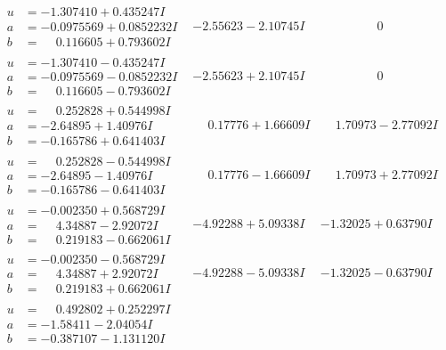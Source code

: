 \documentclass[1p]{elsarticle_modified}
\theoremstyle{definition}
\begin{document}
$$\begin{array}{c|c|c}
\begin{aligned}
u &= -1.307410 + 0.435247 I \\
a &= -0.0975569 + 0.0852232 I \\
b &= \phantom{-}0.116605 + 0.793602 I\end{aligned}
 & -2.55623 - 2.10745 I & \phantom{-0.000000 } 0 \\ \hline\begin{aligned}
u &= -1.307410 - 0.435247 I \\
a &= -0.0975569 - 0.0852232 I \\
b &= \phantom{-}0.116605 - 0.793602 I\end{aligned}
 & -2.55623 + 2.10745 I & \phantom{-0.000000 } 0 \\ \hline\begin{aligned}
u &= \phantom{-}0.252828 + 0.544998 I \\
a &= -2.64895 + 1.40976 I \\
b &= -0.165786 + 0.641403 I\end{aligned}
 & \phantom{-}0.17776 + 1.66609 I & \phantom{-}1.70973 - 2.77092 I \\ \hline\begin{aligned}
u &= \phantom{-}0.252828 - 0.544998 I \\
a &= -2.64895 - 1.40976 I \\
b &= -0.165786 - 0.641403 I\end{aligned}
 & \phantom{-}0.17776 - 1.66609 I & \phantom{-}1.70973 + 2.77092 I \\ \hline\begin{aligned}
u &= -0.002350 + 0.568729 I \\
a &= \phantom{-}4.34887 - 2.92072 I \\
b &= \phantom{-}0.219183 - 0.662061 I\end{aligned}
 & -4.92288 + 5.09338 I & -1.32025 + 0.63790 I \\ \hline\begin{aligned}
u &= -0.002350 - 0.568729 I \\
a &= \phantom{-}4.34887 + 2.92072 I \\
b &= \phantom{-}0.219183 + 0.662061 I\end{aligned}
 & -4.92288 - 5.09338 I & -1.32025 - 0.63790 I \\ \hline\begin{aligned}
u &= \phantom{-}0.492802 + 0.252297 I \\
a &= -1.58411 - 2.04054 I \\
b &= -0.387107 - 1.131120 I\end{aligned}

\end{array}$$
\end{document}
